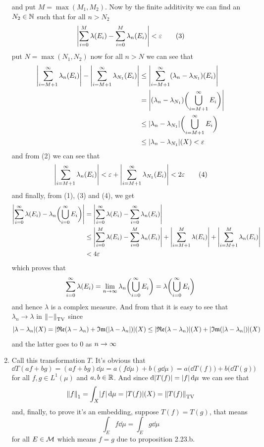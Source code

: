 \documentclass{article}
\begin{document}
\begin{homeworkProblem}
\begin{enumerate}[label=\alph*.]
\begin{equation}
        \end{equation}
        and put $M=\max(M_1, M_2)$. Now by the finite additivity we can find an $N_2\in\mathbb{N}$ such that for all $n>N_2$
        \begin{equation}
            \abs{\sum_{i=0}^{M}\lambda(E_i)-\sum_{i=0}^{M}\lambda_n(E_i)}<\eps \tag{3}
        \end{equation}
        put $N=\max(N_1, N_2)$ now for all $n>N$ we can see that
        \begin{align*}
            \abs{\sum_{i=M+1}^\i \lambda_n(E_i)}-\abs{\sum_{i=M+1}^\i\lambda_{N_1}(E_i)} &\leq \abs{\sum_{i=M+1}^\i (\lambda_n-\lambda_{N_1})(E_i)} \\
            &= \abs{(\lambda_n-\lambda_{N_1})\biggl(\bigcup_{i=M+1}^\i E_i\biggr)} \\
            &\leq \abs{\lambda_n-\lambda_{N_1}}\biggl(\bigcup_{i=M+1}^\i E_i\biggr) \\
            &\leq \abs{\lambda_n-\lambda_{N_1}}(X)<\eps
        \end{align*}
        and from (2) we can see that
        \begin{equation}
            \abs{\sum_{i=M+1}^\i \lambda_n(E_i)}<\eps + \abs{\sum_{i=M+1}^\i \lambda_{N_1}(E_i)}<2\eps \tag{4}
        \end{equation}
        and finally, from (1), (3) and (4), we get
        \begin{align*}
            \abs{\sum_{i=0}^\i\lambda(E_i)-\lambda_n\biggl(\bigcup_{i=0}^\i E_i\biggr)} &= \abs{\sum_{i=0}^\i\lambda(E_i)-\sum_{i=0}^\i\lambda_n(E_i)} \\
            &\leq \abs{\sum_{i=0}^M\lambda(E_i)-\sum_{i=0}^M\lambda_n(E_i)}+\abs{\sum_{i=M+1}^M\lambda(E_i)} + \abs{\sum_{i=M+1}^M\lambda_n(E_i)} \\
            &< 4\eps
        \end{align*}
        which proves that
        \[\sum_{i=0}^\infty\lambda(E_i) = \lim_{n\to\infty} \lambda_n\biggl(\bigcup_{i=0}^\infty E_i\biggr)=\lambda\biggl(\bigcup_{i=0}^\infty E_i\biggr)\]
        and hence $\lambda$ is a complex measure. And from that it is easy to see that $\lambda_n\to\lambda$ in $\norm{-}_{\operatorname{TV}}$ since
        \[\abs{\lambda-\lambda_n}(X)=\abs{\Re(\lambda-\lambda_n)+\Im(\abs{\lambda-\lambda_n})}(X) \leq \abs{\Re(\lambda-\lambda_n)}(X)+\abs{\Im(\abs{\lambda-\lambda_n})}(X)\]
        and the latter goes to $0$ as $n\to\infty$
        \item Call this transformation $T$. It's obvious that 
        \[\dd T(af+bg)=(af+bg)\dd\mu=a(f\dd\mu)+b(g\dd\mu)=a\bigl(\dd T(f)\bigr) + b\bigl(\dd T(g)\bigr)\]
        for all $f,g\in L^1(\mu)$ and $a,b\in\mathbb{R}$. And since $\dd\abs{T(f)}=\abs{f}\dd\mu$ we can see that
        \[\norm{f}_1=\int_X \abs{f}\dd\mu=\abs{T(f)}(X)=\norm{T(f)}_{\operatorname{TV}}\]
        and, finally, to prove it's an embedding, suppose $T(f)=T(g)$, that means
        \[\int_E f\dd\mu = \int_E g\dd\mu\]
        for all $E\in\mathcal{M}$ which means $f=g$ due to proposition 2.23.b.
    \end{enumerate}
\end{homeworkProblem}
\end{document}
